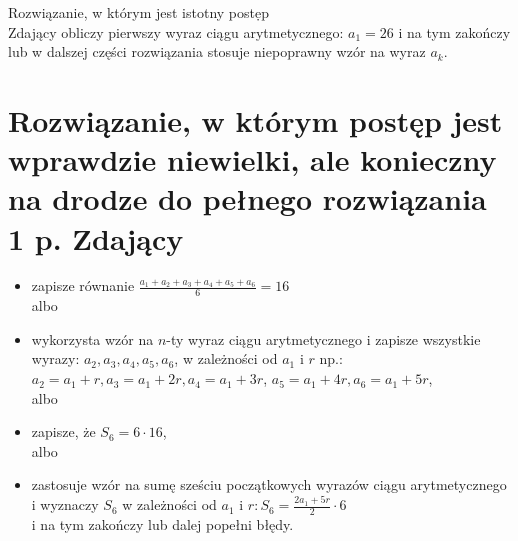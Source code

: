 \documentclass[10pt]{article}
\begin{document}
Rozwiązanie, w którym jest istotny postẹp\\
Zdający obliczy pierwszy wyraz ciągu arytmetycznego: $a_{1}=26$ i na tym zakończy lub w dalszej części rozwiązania stosuje niepoprawny wzór na wyraz $a_{k}$.

\section*{Rozwiązanie, w którym postęp jest wprawdzie niewielki, ale konieczny na drodze do pełnego rozwiązania 1 p. Zdający}
\begin{itemize}
  \item zapisze równanie $\frac{a_{1}+a_{2}+a_{3}+a_{4}+a_{5}+a_{6}}{6}=16$\\
albo
  \item wykorzysta wzór na $n$-ty wyraz ciągu arytmetycznego i zapisze wszystkie wyrazy: $a_{2}, a_{3}, a_{4}, a_{5}, a_{6}$, w zależności od $a_{1}$ i $r$ np.: $a_{2}=a_{1}+r, a_{3}=a_{1}+2 r, a_{4}=a_{1}+3 r$, $a_{5}=a_{1}+4 r, a_{6}=a_{1}+5 r$,\\
albo
  \item zapisze, że $S_{6}=6 \cdot 16$,\\
albo
  \item zastosuje wzór na sumę sześciu początkowych wyrazów ciągu arytmetycznego i wyznaczy $S_{6}$ w zależności od $a_{1}$ i $r: S_{6}=\frac{2 a_{1}+5 r}{2} \cdot 6$\\
i na tym zakończy lub dalej popełni błędy.
\end{itemize}
\end{document}
